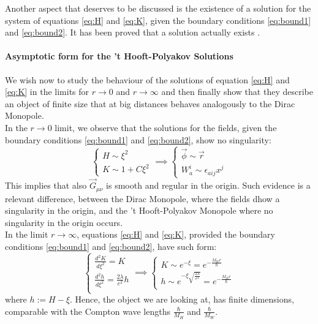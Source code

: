 \documentclass[main.tex]{subfiles}
\begin{document}
Another aspect that deserves to be discussed is the existence of a solution for the system of equations \ref{eq:H} and \ref{eq:K}, given the boundary conditions \ref{eq:bound1} and \ref{eq:bound2}. It has been proved that a solution actually exists \cite{Taubes:Sol}.

\paragraph{Asymptotic form for the 't Hooft-Polyakov Solutions} 
We wish now to study the behaviour of the solutions of equation \ref{eq:H} and \ref{eq:K} in the limits for $r \to 0$ and $r \to \infty$ and then finally show that they describe an object of finite size that at big distances behaves analogously to the Dirac Monopole.\\

In the $r \to 0$ limit, we observe that the solutions for the fields, given the boundary conditions \ref{eq:bound1} and \ref{eq:bound2}, show no singularity: 
\begin{equation}
  \begin{cases}  
  H \sim \xi^2\\
  K \sim 1 + C \xi^2 
  \end{cases}
  \implies
  \begin{cases}
  \vec{\phi} \sim \vec{r}\\
  W^{i}_{a} \sim \epsilon_{aij}x^j
  
  \end{cases}
\end{equation}
This implies that also   $\vec{G}_{\mu \nu}$ is smooth and regular in the origin. Such evidence is a relevant difference, between the Dirac Monopole, where the fields dhow a singularity in the origin, and the 't Hooft-Polyakov Monopole where no singularity in the origin occurs. \\

In the limit $r \to \infty$, equations \ref{eq:H} and \ref{eq:K}, provided the boundary conditions \ref{eq:bound1} and \ref{eq:bound2}, have such form: 
\begin{equation}
\begin{cases}
\frac{d^2 K}{d \xi^2}    = K    \\
\frac{d^2 h}{d \xi^2}   =  \frac{2 \lambda}{e^2} h \\
\end{cases}
\implies
\begin{cases}
K \sim e^{-\xi} = e^{- \frac{M_W r}{\hbar}}\\
h \sim e^{-\xi \sqrt{\frac{2 \lambda}{e^2}}} = e^{- \frac{M_H r}{\hbar}} \\
\end{cases}
\end{equation}
where $h:= H - \xi$.
Hence, the object we are looking at, has finite dimensions, comparable with the Compton wave lengths $\frac{\hbar}{M_H}$ and $\frac{\hbar}{M_W}$. \\
\end{document}
